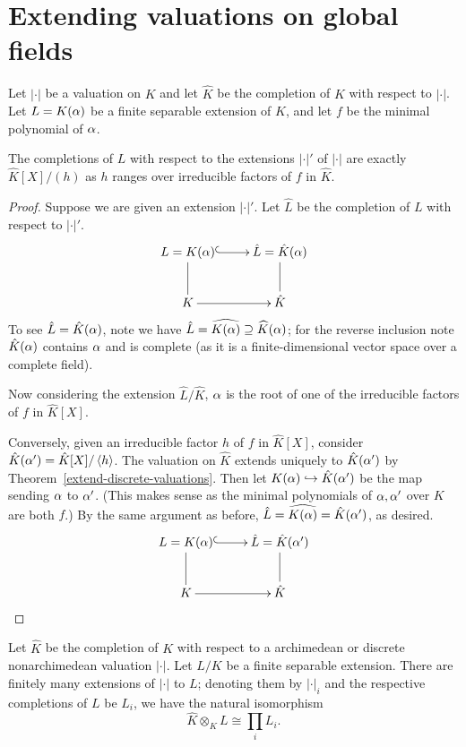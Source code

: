 \section{Extending valuations on global fields}
\begin{thm}
Let $|\cdot|$ be a valuation on $K$ and let $\hat{K}$ be the completion of $K$ with respect to $|\cdot|$. Let $L=K(\alpha)$ be a finite separable extension of $K$, and let $f$ be the minimal polynomial of $\alpha$.

The completions of $L$ with respect to the extensions $|\cdot|'$ of $|\cdot|$ are exactly $\hat{K}[X]/(h)$ as $h$ ranges over irreducible factors of $f$ in $\hat{K}$.
\end{thm}
\begin{proof}
Suppose we are given an extension $|\cdot|'$. Let $\hat{L}$ be the completion of $L$ with respect to $|\cdot|'$.
\[
\xymatrix{
L=K(\al)\ar@{^(->}[r]\ar@{-}[d] & \hat L=\hat K(\al)\ar@{-}[d]\\
K\ar[r] & \hat{K}
}
\]
To see $\hat L = \hat K(\alpha)$, note we have $\hat L=\widehat{K(\alpha)}\supseteq \widehat{K}(\alpha)$; for the reverse inclusion note $\hat K(\alpha)$ contains $\alpha$ and is complete (as it is a finite-dimensional vector space over a complete field). 

Now considering the extension $\hat L/\hat K$, $\alpha$ is the root of one of the irreducible factors of $f$ in $\hat K[X]$.

Conversely, given an irreducible factor $h$ of $f$ in $\hat K[X]$, consider $\hat K(\alpha')=\hat K[X]/\left\langle {h}\right\rangle$. 
The valuation on $\hat K$ extends uniquely to $\hat K(\alpha')$ by Theorem~\ref{extend-discrete-valuations}. Then let $K(\alpha)\hookrightarrow \hat K(\alpha')$ be the map sending $\alpha$ to $\alpha'$. (This makes sense as the minimal polynomials of $\alpha,\alpha'$ over $K$ are both $f$.) By the same argument as before, $\hat L=\widehat{K(\alpha)}=\hat K(\alpha')$, as desired.
\[
\xymatrix{
L=K(\al)\ar@{^(->}[r]\ar@{-}[d] & \hat L=\hat K(\al')\ar@{-}[d]\\
K\ar[r] & \hat{K}
}
\]
\end{proof}
\begin{thm}
Let $\hat K$ be the completion of $K$ with respect to
a archimedean or discrete nonarchimedean valuation $|\cdot|$.
Let $L/K$ be a finite separable extension. There are finitely many extensions of $|\cdot|$ to $L$; denoting them by $|\cdot|_i$ and the respective completions of $L$ be $L_i$, we have the natural isomorphism
\[
\hat K\otimes_K L\cong\prod_{i} L_i.
\]
\end{thm}
